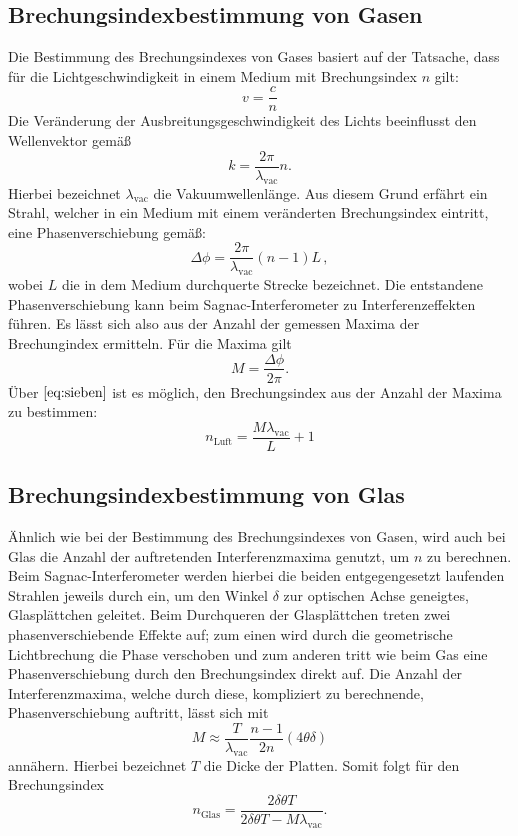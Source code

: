\subsection{Brechungsindexbestimmung von Gasen}
Die Bestimmung des Brechungsindexes von Gases basiert auf der Tatsache, dass für die Lichtgeschwindigkeit in einem Medium mit Brechungsindex $n$ gilt:
\begin{equation}
  v=\frac{c}{n}
\end{equation}
Die Veränderung der Ausbreitungsgeschwindigkeit des Lichts beeinflusst den Wellenvektor gemäß
\begin{equation}
  k = \frac{2\pi}{\lambda_{\text{vac}}}n.
\end{equation}
Hierbei bezeichnet $\lambda_{\text{vac}}$ die Vakuumwellenlänge.
Aus diesem Grund erfährt ein Strahl, welcher in ein Medium mit einem veränderten Brechungsindex eintritt, eine Phasenverschiebung gemäß:
\begin{equation}
  \Delta \phi= \frac{2\pi}{\lambda_{\text{vac}}}(n-1)L \, ,
  \label{eq:sieben}
\end{equation}
wobei  $L$ die in dem Medium durchquerte Strecke bezeichnet. Die entstandene Phasenverschiebung kann beim Sagnac-Interferometer zu Interferenzeffekten führen. Es lässt sich also
aus der Anzahl der gemessen Maxima der Brechungindex ermitteln. Für die Maxima gilt
\begin{equation}
  M = \frac{\Delta \phi}{2 \pi}.
\end{equation}
Über $\ref{eq:sieben}$ ist es möglich, den Brechungsindex aus der Anzahl der Maxima zu bestimmen:
\begin{equation}
  n_\text{Luft}=\frac{M\lambda_{\text{vac}}}{L}+1
  \label{eq:gas}
\end{equation}
\subsection{Brechungsindexbestimmung von Glas}
Ähnlich wie bei der Bestimmung des Brechungsindexes von Gasen, wird auch bei Glas die Anzahl der auftretenden Interferenzmaxima genutzt, um $n$ zu berechnen. Beim Sagnac-Interferometer
werden hierbei die beiden entgegengesetzt laufenden Strahlen jeweils durch ein, um den Winkel $\delta$ zur optischen Achse geneigtes, Glasplättchen geleitet. Beim Durchqueren
der Glasplättchen treten zwei phasenverschiebende Effekte auf; zum einen wird durch die geometrische Lichtbrechung die Phase verschoben und zum anderen tritt wie beim
Gas eine Phasenverschiebung durch den Brechungsindex direkt auf.
Die Anzahl der Interferenzmaxima, welche durch diese, kompliziert zu berechnende, Phasenverschiebung auftritt, lässt  sich mit
\begin{equation}
  M \approx \frac{T}{\lambda_{\text{vac}}}\frac{n-1}{2n}(4\theta \delta)
\end{equation}
annähern. Hierbei bezeichnet $T$ die Dicke der Platten. Somit folgt für den Brechungsindex
\begin{equation}
  n_\text{Glas}=\frac{2\delta \theta T}{2\delta \theta T - M\lambda_\text{vac}}.
  \label{eq:glas}
\end{equation}
